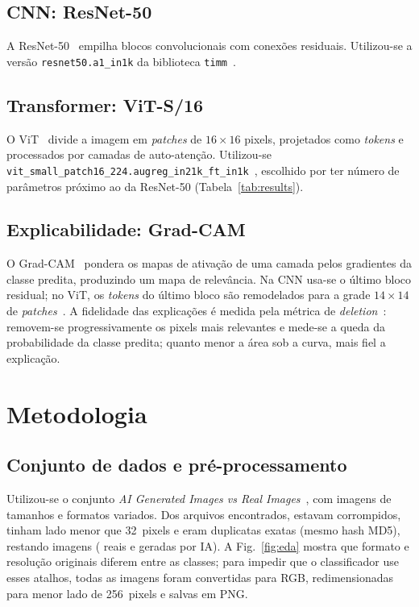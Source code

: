 \documentclass[conference]{IEEEtran}
\begin{document}
\subsection{CNN: ResNet-50}
A ResNet-50~\cite{he2016resnet} empilha blocos convolucionais com conexões
residuais. Utilizou-se a versão \texttt{resnet50.a1\_in1k} da biblioteca
\texttt{timm}~\cite{wightman2019timm,wightman2021rsb}.

\subsection{Transformer: ViT-S/16}
O ViT~\cite{dosovitskiy2021vit} divide a imagem em \emph{patches} de
$16\times16$ pixels, projetados como \emph{tokens} e processados por camadas de
auto-atenção. Utilizou-se \texttt{vit\_small\_patch16\_224.}\allowbreak\texttt{augreg\_in21k\_ft\_in1k}~\cite{steiner2022augreg},
escolhido por ter número de parâmetros próximo ao da ResNet-50 (Tabela~\ref{tab:results}).

\subsection{Explicabilidade: Grad-CAM}
O Grad-CAM~\cite{selvaraju2017gradcam} pondera os mapas de ativação de uma camada
pelos gradientes da classe predita, produzindo um mapa de relevância. Na CNN usa-se
o último bloco residual; no ViT, os \emph{tokens} do último bloco são remodelados
para a grade $14\times14$ de \emph{patches}~\cite{gildenblat2021gradcam}. A fidelidade
das explicações é medida pela métrica de \emph{deletion}~\cite{petsiuk2018rise}:
removem-se progressivamente os pixels mais relevantes e mede-se a queda da
probabilidade da classe predita; quanto menor a área sob a curva, mais fiel a
explicação.

\section{Metodologia}
\subsection{Conjunto de dados e pré-processamento}
Utilizou-se o conjunto \emph{AI Generated Images vs Real Images}~\cite{kaggle_dataset},
com imagens de tamanhos e formatos variados. Dos \NFound{} arquivos encontrados,
\NCorrupted{} estavam corrompidos, \NTiny{} tinham lado menor que 32~pixels e
\NDuplicates{} eram duplicatas exatas (mesmo hash MD5), restando \NImages{} imagens
(\NReal{} reais e \NAi{} geradas por IA). A Fig.~\ref{fig:eda} mostra que formato e
resolução originais diferem entre as classes; para impedir que o classificador use
esses atalhos, todas as imagens foram convertidas para RGB, redimensionadas para
menor lado de 256~pixels e salvas em PNG.
\end{document}
